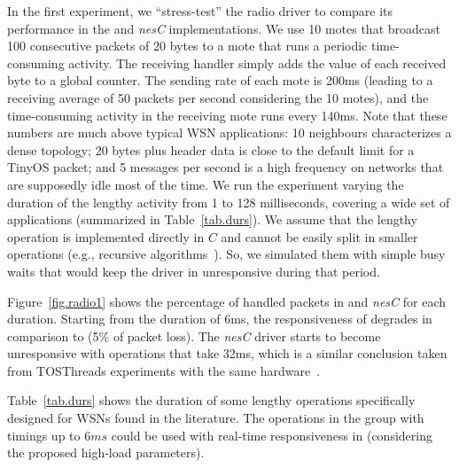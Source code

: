 In the first experiment, we ``stress-test'' the radio driver to compare its 
performance in the \CEU and \emph{nesC} implementations.
We use 10 motes that broadcast 100 consecutive packets of 20 bytes to a mote 
that runs a periodic time-consuming activity.
The receiving handler simply adds the value of each received byte to a global 
counter.
%
The sending rate of each mote is 200ms (leading to a receiving average of 50 
packets per second considering the 10 motes), and the time-consuming activity 
in the receiving mote runs every 140ms.
%
Note that these numbers are much above typical WSN applications: 10 neighbours 
characterizes a dense topology; 20 bytes plus header data is close to the 
default limit for a TinyOS packet; and 5 messages per second is a high 
frequency on networks that are supposedly idle most of the time.
%
We run the experiment varying the duration of the lengthy activity from 1 to 
128 milliseconds, covering a wide set of applications (summarized in 
Table~\ref{tab.durs}).
%
We assume that the lengthy operation is implemented directly in $C$ and cannot 
be easily split in smaller operations (e.g., recursive 
algorithms~\cite{wsn.comparison,wsn.tosthreads}).
So, we simulated them with simple busy waits that would keep the driver in \CEU 
unresponsive during that period.

Figure~\ref{fig.radio1} shows the percentage of handled packets in \CEU and 
\emph{nesC} for each duration.
%
Starting from the duration of 6ms, the responsiveness of \CEU degrades in 
comparison to \nesc (5\% of packet loss).
%
The \emph{nesC} driver starts to become unresponsive with operations that take 
32ms, which is a similar conclusion taken from TOSThreads experiments with the 
same hardware~\cite{wsn.tosthreads}.
%

%
Table~\ref{tab.durs} shows the duration of some lengthy operations specifically 
designed for WSNs found in the literature.
The operations in the group with timings up to $6ms$ could be used with 
real-time responsiveness in \CEU (considering the proposed high-load 
parameters).


